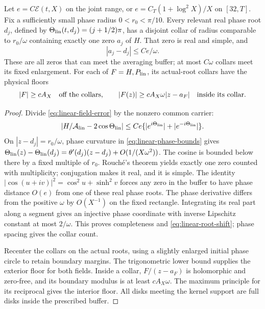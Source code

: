 \begin{lemma}\label{lem:linear-collars}
Let $e=C\mathcal E(t,X)$ on the joint range, or
$e=C_T(1+\log^2X)/X$ on $[32,T]$.  Fix a sufficiently small phase
radius $0<r_0<\pi/10$.  Every relevant real phase root $d_j$, defined by
$\Theta_{\rm lin}(t,d_j)=(j+1/2)\pi$, has a disjoint collar of radius
comparable to $r_0/\omega$ containing exactly one zero $a_j$ of $H$.
That zero is real and simple, and
\begin{equation}
 |a_j-d_j|\le Ce/\omega.
 \label{eq:linear-root-shift}
\end{equation}
These are all zeros that can meet the averaging buffer; at most
$C\omega$ collars meet its fixed enlargement.  For each of
$F=H,P_{\rm lin}$, its actual-root collars have the physical floors
\begin{equation}
 |F|\ge cA_X\quad\hbox{off the collars},\qquad
 |F(z)|\ge cA_X\omega|z-a_F|\quad\hbox{inside its collar}.
 \label{eq:linear-collar-floors}
\end{equation}
\end{lemma}
\begin{proof}
Divide \eqref{eq:linear-field-error} by the nonzero common carrier:
\[
 |H/\mathcal A_{\rm lin}-2\cos\Theta_{\rm lin}|
 \le Ce\{ |e^{i\Theta_{\rm lin}}|+|e^{-i\Theta_{\rm lin}}|\}.
\]
On $|z-d_j|=r_0/\omega$, phase curvature in
\eqref{eq:linear-phase-bounds} gives
$\Theta_{\rm lin}(z)-\Theta_{\rm lin}(d_j)
=\theta'(d_j)(z-d_j)+O(1/(X\omega^2))$.
The cosine is bounded below there by a fixed multiple of $r_0$.
Rouch\'e's theorem yields exactly one zero counted with multiplicity;
conjugation makes it real, and it is simple.  The identity
$|\cos(u+iv)|^2=\cos^2u+\sinh^2v$ forces any zero in the buffer to
have phase distance $O(e)$ from one of these real phase roots.
The phase derivative differs from the positive $\omega$ by $O(X^{-1})$
on the fixed rectangle.  Integrating its real part along a segment
gives an injective phase coordinate with inverse Lipschitz constant
at most $2/\omega$.  This proves completeness and
\eqref{eq:linear-root-shift}; phase spacing gives the collar count.

Recenter the collars on the actual roots, using a slightly enlarged
initial phase circle to retain boundary margins.  The trigonometric
lower bound supplies the exterior floor for both fields.  Inside a
collar, $F/(z-a_F)$ is holomorphic and zero-free, and its boundary
modulus is at least $cA_X\omega$.  The maximum principle for its
reciprocal gives the interior floor.  All disks meeting the kernel
support are full disks inside the prescribed buffer.
\end{proof}

